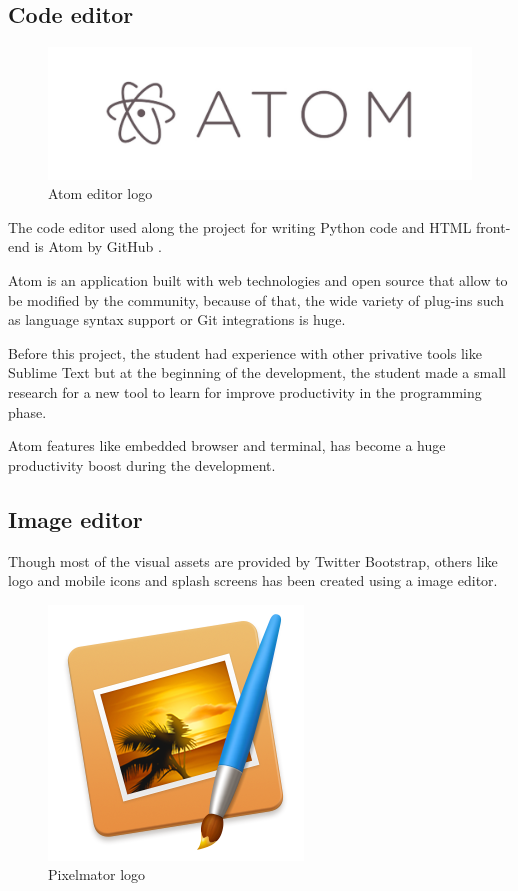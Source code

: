 \documentclass{DeustoFDP}
\begin{document}
\subsection{Code editor}
\begin{figure}[h]
\centering
\includegraphics[width=0.7\linewidth]{fig/atom}
\caption[Atom editor logo]{Atom editor logo}
\label{fig:atom}
\end{figure}

The code editor used along the project for writing Python code and HTML front-end is Atom by GitHub \cite{atom}.

Atom is an application built with web technologies and open source that allow to be modified by the community, because of that, the wide variety of plug-ins such as language syntax support or Git integrations is huge.

Before this project, the student had experience with other privative tools like Sublime Text but at the beginning of the development, the student made a small research for a new tool to learn for improve productivity in the programming phase.

Atom features like embedded browser and terminal, has become a huge productivity boost during the development.
\subsection{Image editor}
Though most of the visual assets are provided by Twitter Bootstrap, others like logo and mobile icons and splash screens has been created using a image editor.

\begin{figure}[h]
\centering
\includegraphics[width=0.3\linewidth]{fig/pixelmator}
\caption[Pixelmator logo]{Pixelmator logo}
\label{fig:pixelmator}
\end{figure}
\end{document}
